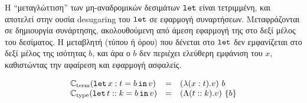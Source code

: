 Η ``μεταγλώττιση'' των μη-αναδρομικών δεσιμάτων $\operatorname{\texttt{let}}$ είναι τετριμμένη, και
αποτελεί στην ουσία desugaring του $\operatorname{\texttt{let}}$ σε εφαρμογή συναρτήσεων.
Μεταφράζονται σε δημιουργία συνάρτησης, ακολουθούμενη από άμεση εφαρμογή της
στο δεξί μέλος του δεσίματος. Η μεταβλητή (τύπου ή όρου) που δένεται στο
$\operatorname{\texttt{let}}$ δεν εμφανίζεται στο δεξί μέλος της ισότητας $b$, και άρα ο $b$ δεν
περιέχει ελεύθερη εμφάνιση του $x$, καθιστώντας την αφαίρεση και εφαρμογή
ασφαλείς.

  \begin{displaymath} \begin{array}{lll} \mathbb{C}_{\mathrm{term}}(\operatorname{\texttt{let}} x : t = b \operatorname{\texttt{in}} v)
  &=& (\lambda (x : t) . v)\ b\\ \mathbb{C}_{\mathrm{type}}(\operatorname{\texttt{let}} t :: k = b \operatorname{\texttt{in}} v) &=&
  (\Lambda (t :: k) . v)\ \{b\} \end{array} \end{displaymath}
